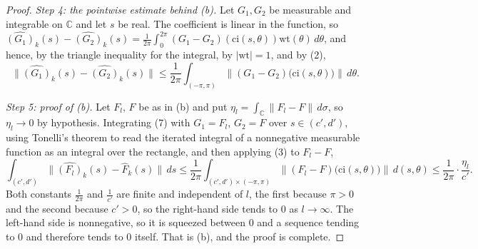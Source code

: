 \begin{proof}
\emph{Step 4: the pointwise estimate behind (b).}  Let $G_1,G_2$ be measurable
and integrable on $\mathbb{C}$ and let $s$ be real.  The coefficient is linear
in the function, so
$\widehat{(G_1)}_k(s)-\widehat{(G_2)}_k(s)
=\frac1{2\pi}\int_0^{2\pi}(G_1-G_2)(\mathrm{ci}(s,\theta))
\mathrm{wt}(\theta)\,d\theta$, and hence, by the triangle inequality for the
integral, by $|\mathrm{wt}|=1$, and by (2),
\begin{equation}\tag{7}
  \bigl\|\widehat{(G_1)}_k(s)-\widehat{(G_2)}_k(s)\bigr\|
  \le\frac1{2\pi}\int_{(-\pi,\pi)}
      \bigl\|(G_1-G_2)\bigl(\mathrm{ci}(s,\theta)\bigr)\bigr\|\,d\theta .
\end{equation}

\emph{Step 5: proof of (b).}  Let $F_l$, $F$ be as in (b) and put
$\eta_l=\int_{\mathbb{C}}\|F_l-F\|\,d\sigma$, so $\eta_l\to0$ by hypothesis.
Integrating (7) with $G_1=F_l$, $G_2=F$ over $s\in(c',d')$, using Tonelli's
theorem to read the iterated integral of a nonnegative measurable function as
an integral over the rectangle, and then applying (3) to $F_l-F$,
\[
  \int_{(c',d')}\bigl\|\widehat{(F_l)}_k(s)-\widehat F_k(s)\bigr\|\,ds
  \le\frac1{2\pi}\int_{(c',d')\times(-\pi,\pi)}
      \bigl\|(F_l-F)\bigl(\mathrm{ci}(s,\theta)\bigr)\bigr\|\,d(s,\theta)
  \le\frac1{2\pi}\cdot\frac{\eta_l}{c'} .
\]
Both constants $\frac1{2\pi}$ and $\frac1{c'}$ are finite and independent of
$l$, the first because $\pi>0$ and the second because $c'>0$, so the
right-hand side tends to $0$ as $l\to\infty$.  The left-hand side is
nonnegative, so it is squeezed between $0$ and a sequence tending to $0$ and
therefore tends to $0$ itself.  That is (b), and the proof is complete.
\end{proof}
